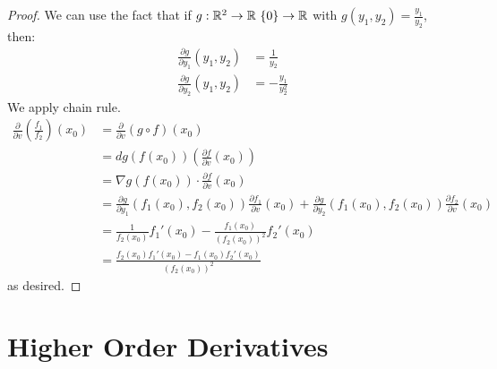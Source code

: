\documentclass{report}
\begin{document}
\begin{proof}
    We can use the fact that if $g: \RR^2 \to \RR \ \{0\} \to \RR$ with $g(y_1, y_2) = \frac{y_1}{y_2}$, then:
    \begin{align*}
        \frac{\partial g}{\partial y_1}(y_1, y_2) &= \frac{1}{y_2} \\
        \frac{\partial g}{\partial y_2}(y_1, y_2) &= -\frac{y_1}{y_2^2}
    \end{align*}
    We apply chain rule. 
    \begin{align*}
        \frac{\partial}{\partial v}\left( \frac{f_1}{f_2}\right)(x_0) &= \frac{\partial}{\partial v}\left(g \circ f\right)(x_0) \\
        &= dg(f(x_0))\left( \frac{\partial f}{\partial v}(x_0) \right) \\
        &= \nabla g(f(x_0)) \cdot \frac{\partial f}{\partial v}(x_0) \\
        &= \frac{\partial g}{\partial y_1}(f_1(x_0), f_2(x_0))\frac{\partial f_1}{\partial v}(x_0) + \frac{\partial g}{\partial y_2}(f_1(x_0), f_2(x_0))\frac{\partial f_2}{\partial v}(x_0) \\
        &= \frac{1}{f_2(x_0)}f_1'(x_0) - \frac{f_1(x_0)}{(f_2(x_0))^2}f_2'(x_0) \\
        &= \frac{f_2(x_0)f_1'(x_0) - f_1(x_0)f_2'(x_0)}{(f_2(x_0))^2}
    \end{align*}
    as desired.
\end{proof}
\newpage
\section{Higher Order Derivatives}
\end{document}
